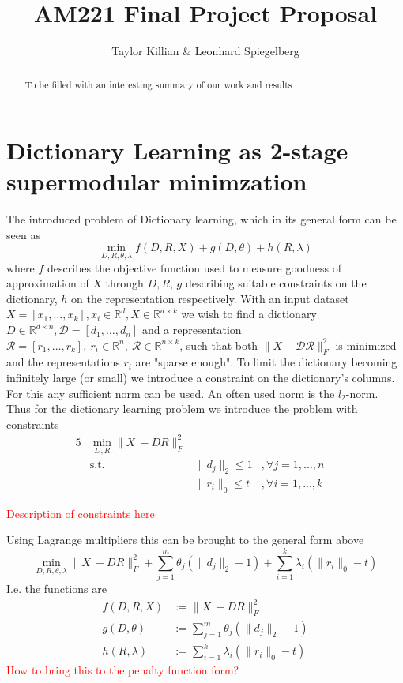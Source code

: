 \documentclass{article}
\newcommand{\R}{\mathbb{R}}
\begin{document}
\title{AM221 Final Project Proposal}
\author{Taylor Killian \& Leonhard Spiegelberg}
\maketitle

\begin{abstract}
To be filled with an interesting summary of our work and results

\end{abstract}


\section{Dictionary Learning as 2-stage supermodular minimzation}
The introduced problem of Dictionary learning, which in its general form can be seen as
\[
\min_{D, R, \theta, \lambda} f(D, R, X) + g(D, \theta) + h(R, \lambda)
\]
where $f$ describes the objective function used to measure goodness of approximation of $X$ through $D, R$, $g$ describing suitable constraints on the dictionary, $h$ on the representation respectively.
With an input dataset $X=[x_1, \dots, x_k],  x_i \in \R^d,  X \in \R^{d\times k}$ we wish to find a dictionary $D \in \R^{d\times n},  \mathcal{D} = [d_1, \dots, d_n]$ and a representation $\mathcal{R}=[r_1,\dots,r_k], \ r_i\in\R^n, \ \mathcal{R}\in\R^{n\times k}$, such that both $\|X-\mathcal{D}\mathcal{R}\|_F^2$ is minimized and the representations $r_i$ are "sparse enough". To limit the dictionary becoming infinitely large (or small) we introduce a constraint on the dictionary's columns. For this any sufficient norm can be used. An often used norm is the $l_2$-norm. 
Thus for the dictionary learning problem we introduce the problem with constraints
\begin{alignat}{5}
         &\min_{D, R} \|X \ -D R\|_F^2  & \quad   \\
         &\text{s.t.}  \quad  &\|d_j\|_2 \leq 1&, \forall j=1, ...,n  \quad \\
         &  \quad  &\|r_i\|_0 \leq t&, \forall i=1, ...,k  \quad 
\end{alignat}

\textcolor{red}{Description of constraints here}


Using Lagrange multipliers this can be brought to the general form above
\[
\min_{D, R, \theta, \lambda} \|X \ -D R\|_F^2 + \sum_{j=1}^m \theta_j (\| d_j\|_2 - 1)+ \sum_{i=1}^k \lambda_i (\| r_i \|_0 - t)
\]
I.e. the functions are
\[
\begin{split}
f(D, R, X) &:= \|X \ -D R\|_F^2 \\
g(D, \theta) &:= \sum_{j=1}^m \theta_j (\| d_j\|_2 - 1) \\
h(R, \lambda) &:= \sum_{i=1}^k \lambda_i (\| r_i \|_0 - t)
\end{split}
\]
\textcolor{red}{How to bring this to the penalty function form?}
\end{document}

